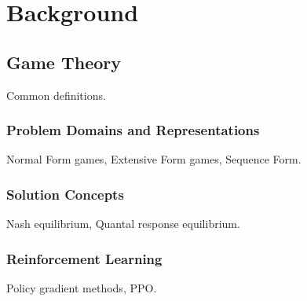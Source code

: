 \chapter{Background}

\section{Game Theory}
Common definitions.

\subsection{Problem Domains and Representations}
Normal Form games, Extensive Form games, Sequence Form.

\subsection{Solution Concepts}
Nash equilibrium, Quantal response equilibrium.

\subsection{Reinforcement Learning}
Policy gradient methods, PPO.